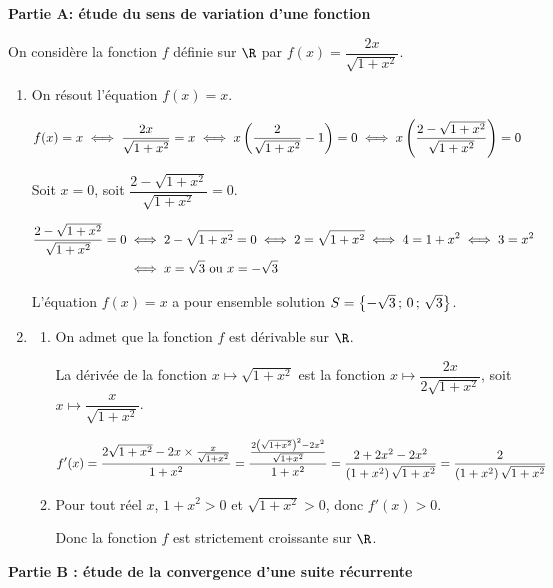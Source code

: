 \textbf{Partie A: étude du sens de variation d'une fonction}

\medskip

On considère la fonction $f$ définie sur $\R$ par 
$f(x) = \dfrac{2x}{\sqrt{1 + x^2}}$.

\begin{enumerate}
\item On résout l'équation $f(x) = x$.

$\aligned
f(x)=x
& \iff  \dfrac{2x}{\sqrt{1 + x^2}} =x
\iff x\left ( \dfrac{2}{\sqrt{1 + x^2}} - 1\right )=0
\iff x \left (\dfrac{2-\sqrt{1+x^2}}{\sqrt{1+x^2}}\right )=0
\endaligned$

Soit $x=0$, soit $\dfrac{2-\sqrt{1+x^2}}{\sqrt{1+x^2}}=0$.

$\aligned
\dfrac{2-\sqrt{1+x^2}}{\sqrt{1+x^2}}=0
& \iff 2-\sqrt{1+x^2}=0
\iff 2=\sqrt{1+x^2}
\iff 4=1+x^2
\iff 3=x^2\\
& \iff x=\sqrt{3}  \text{ ou } x=-\sqrt{3}
\endaligned$

L'équation $f(x)=x$ a pour ensemble solution $S=\left \{ -\sqrt{3}\,;\,0\,;\,\sqrt{3}\strut \right \}$.

\item
	\begin{enumerate}
		\item On admet que la fonction $f$ est dérivable sur $\R$.

La dérivée de la fonction $x \longmapsto \sqrt{1+x^2}$ est la fonction $x \longmapsto \dfrac{2x}{2\sqrt{1+x^2}}$, soit $x \longmapsto \dfrac{x}{\sqrt{1+x^2}}$.

$\aligned
f'(x)
& = \dfrac{2\sqrt{1+x^2} - 2x\times\frac{x}{\sqrt{1+x^2}}}{1+x^2}
= \dfrac{\frac{2\left ( \sqrt{1+x^2}\right )^2-2x^2}{\sqrt{1+x^2}}}{1+x^2}
= \dfrac{2+2x^2-2x^2}{\left (1+x^2\right ) \sqrt{1+x^2}}
= \dfrac{2}{\left (1+x^2\right ) \sqrt{1+x^2}}
\endaligned$

		\item %
Pour tout réel $x$, $1+x^2>0$ et $\sqrt{1+x^2}>0$, donc $f'(x)>0$.

Donc la fonction $f$ est strictement croissante sur $\R$.
	\end{enumerate}
\end{enumerate}

\medskip

\textbf{Partie B : étude de la convergence d'une suite récurrente}

